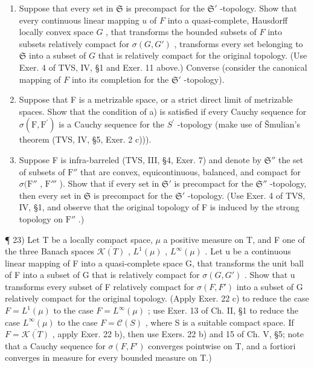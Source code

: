 \begin{enumerate}
\def\labelenumi{\alph{enumi})}
\item
  Suppose that every set in \(\mathfrak{S}\) is precompact for the \(\mathfrak{S}'\) -topology. Show that every continuous linear mapping \(u\) of \(F\) into a quasi-complete, Hausdorff locally convex space \(G\) , that transforms the bounded subsets of \(F\) into subsets relatively compact for \(\sigma(G, G')\) , transforms every set belonging to \(\mathfrak{S}\) into a subset of \(G\) that is relatively compact for the original topology. (Use Exer. 4 of TVS, IV, §1 and Exer. 11 above.) Converse (consider the canonical mapping of \(F\) into its completion for the \(\mathfrak{S}'\) -topology).
\item
  Suppose that F is a metrizable space, or a strict direct limit of metrizable spaces. Show that the condition of a) is satisfied if every Cauchy sequence for \(\sigma(\mathrm{F},\mathrm{F}^{\prime})\) is a Cauchy sequence for the \(S^{\prime}\) -topology (make use of Šmulian's theorem (TVS, IV, §5, Exer. 2 c))).
\item
  Suppose F is infra-barreled (TVS, III, §4, Exer. 7) and denote by \(\mathfrak{S}''\) the set of subsets of \(\mathrm{F}''\) that are convex, equicontinuous, balanced, and compact for \(\sigma(\mathrm{F}''\) , \(\mathrm{F}'''\) ). Show that if every set in \(\mathfrak{S}'\) is precompact for the \(\mathfrak{S}''\) -topology, then every set in \(\mathfrak{S}\) is precompact for the \(\mathfrak{S}'\) -topology. (Use Exer. 4 of TVS, IV, §1, and observe that the original topology of F is induced by the strong topology on \(\mathrm{F}''\) .)
\end{enumerate}

¶ 23) Let T be a locally compact space, \(\mu\) a positive measure on T, and F one of the three Banach spaces \(\overline{\mathcal{K}(T)}\) , \(L^1(\mu)\) , \(L^\infty(\mu)\) . Let u be a continuous linear mapping of F into a quasi-complete space G, that transforms the unit ball of F into a subset of G that is relatively compact for \(\sigma(G, G')\) . Show that u transforms every subset of F relatively compact for \(\sigma(F, F')\) into a subset of G relatively compact for the original topology. (Apply Exer. 22 c) to reduce the case \(F = L^1(\mu)\) to the case \(F = L^\infty(\mu)\) ; use Exer. 13 of Ch. II, §1 to reduce the case \(L^\infty(\mu)\) to the case \(F = \mathcal{C}(S)\) , where S is a suitable compact space. If \(F = \overline{\mathcal{K}(T)}\) , apply Exer. 22 b), then use Exers. 22 b) and 15 of Ch. V, §5; note that a Cauchy sequence for \(\sigma(F, F')\) converges pointwise on T, and a fortiori converges in measure for every bounded measure on T.)

